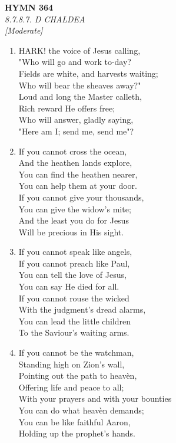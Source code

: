 \documentclass[11pt,a4paper]{article}
\begin{document}
\newpage
\begin{center}
    {\Large \textbf{HYMN 364}}
    \\
    \textit{8.7.8.7. D CHALDEA}
    \\
    \textit{\small [Moderate]}
\end{center}
\vspace{1em}

\begin{enumerate}
    \item HARK! the voice of Jesus calling, \\
        "Who will go and work to-day? \\
        Fields are white, and harvests waiting; \\
        Who will bear the sheaves away?" \\
        Loud and long the Master calleth, \\
        Rich reward He offers free; \\
        Who will answer, gladly saying, \\
        "Here am I; send me, send me"?

    \item If you cannot cross the ocean, \\
        And the heathen lands explore, \\
        You can find the heathen nearer, \\
        You can help them at your door. \\
        If you cannot give your thousands, \\
        You can give the widow's mite; \\
        And the least you do for Jesus \\
        Will be precious in His sight.

    \item If you cannot speak like angels, \\
        If you cannot preach like Paul, \\
        You can tell the love of Jesus, \\
        You can say He died for all. \\
        If you cannot rouse the wicked \\
        With the judgment's dread alarms, \\
        You can lead the little children \\
        To the Saviour's waiting arms.

    \item If you cannot be the watchman, \\
        Standing high on Zion's wall, \\
        Pointing out the path to heav\`en, \\
        Offering life and peace to all; \\
        With your prayers and with your bounties \\
        You can do what heav\`en demands; \\
        You can be like faithful Aaron, \\
        Holding up the prophet's hands.


\end{enumerate}
\end{document}
